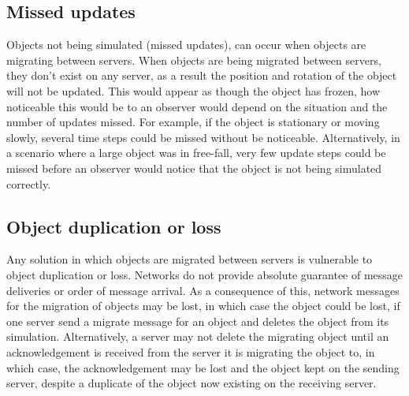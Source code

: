 \subsection{Missed updates}
Objects not being simulated (missed updates), can occur when objects are migrating between servers. When objects are being migrated between servers, they don't exist on any server, as a result the position and rotation of the object will not be updated. This would appear as though the object has frozen, how noticeable this would be to an observer would depend on the situation and the number of updates missed. For example, if the object is stationary or moving slowly, several time steps could be missed without be noticeable. Alternatively, in a scenario where a large object was in free-fall, very few update steps could be missed before an observer would notice that the object is not being simulated correctly.

\subsection{Object duplication or loss}
Any solution in which objects are migrated between servers is vulnerable to object duplication or loss. Networks do not provide absolute guarantee of message deliveries or order of message arrival. As a consequence of this, network messages for the migration of objects may be lost, in which case the object could be lost, if one server send a migrate message for an object and deletes the object from its simulation. Alternatively, a server may not delete the migrating object until an acknowledgement is received from the server it is migrating the object to, in which case, the acknowledgement may be lost and the object kept on the sending server, despite a duplicate of the object now existing on the receiving server. %



